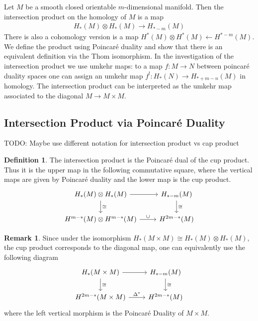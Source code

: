 \documentclass{scrartcl}
\theoremstyle{plain}
\theoremstyle{definition}
\newtheorem{definition}[theorem]{Definition}
\newtheorem{remark}[theorem]{Remark}
\newcommand{\iso}{\cong}
\newcommand{\from}{\leftarrow}
\begin{document}
Let $M$ be a smooth closed orientable $m$-dimensional manifold. Then the intersection product on the homology of $M$ is a map
\begin{align*}
    H_*(M) \otimes H_*(M) \to H_{*-m}(M)
\end{align*}
There is also a cohomology version is a map $H^*(M) \otimes H^*(M) \from H^{*-m}(M)$. We define the product using Poincaré duality and show that there is an equivalent definition via the Thom isomorphism. In the investigation of the intersection product we use umkehr maps: to a map $f\colon M\to N$ between poincaré duality spaces one can assign an umkehr map $f^!\colon H_*(N)\to H_{*+m-n}(M)$ in homology. The intersection product can be interpreted as the umkehr map associated to the diagonal $M\to M\times M$. 

\subsection{Intersection Product via Poincaré Duality} \label{subsec:intersection_product_via_pd}

TODO: Maybe use different notation for intersection product vs cap product
\begin{definition}
The intersection product is the Poincaré dual of the cup product. Thus it is the upper map in the following commutative square, where the vertical maps are given by Poincaré duality and the lower map is the cup product.
\begin{equation}
    \begin{tikzcd}
        H_*(M) \otimes H_*(M) \dar["\iso"] \rar & H_{*-m}(M) \dar["\iso"] \\
        H^{m-*}(M)\otimes H^{m-*}(M) \rar["\cup"] &  H^{2m-*}(M)
    \end{tikzcd}
\end{equation}
\end{definition}
\begin{remark}
Since under the isomorphism $H_*(M\times M) \iso H_*(M)\otimes H_*(M)$, the cup product corresponds to the diagonal map, one can equivalently use the following diagram
\begin{equation}
    \begin{tikzcd}
        H_*(M\times M) \dar["\iso"] \rar & H_{*-m}(M) \dar["\iso"] \\
        H^{2m-*}(M\times M) \rar["\Delta^*"] & H^{2m-*}(M)
    \end{tikzcd}
\end{equation}
where the left vertical morphism is the Poincaré Duality of $M\times M$.
\end{remark}
\end{document}
